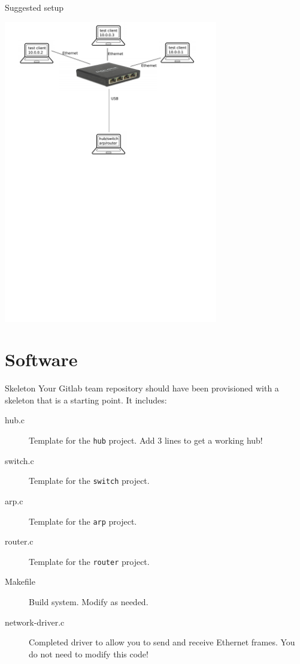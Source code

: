 \documentclass{beamer}
\begin{document}
\begin{frame}{Suggested setup}
\begin{center}
\includegraphics[width=0.7\textwidth]{arch.pdf}
\end{center}
\end{frame}


\section{Software}

\begin{frame}{Skeleton}
Your Gitlab team repository should have been provisioned with a skeleton
that is a starting point. It includes:
\begin{description}
\item[hub.c] Template for the {\tt hub} project. Add 3 lines to get a working hub!
\item[switch.c] Template for the {\tt switch} project.
\item[arp.c] Template for the {\tt arp} project.
\item[router.c] Template for the {\tt router} project.
\item[Makefile] Build system.  Modify as needed.
\item[network-driver.c] Completed driver to allow you to send and receive
   Ethernet frames. You do not need to modify this code!
\end{description}
\end{frame}
\end{document}
